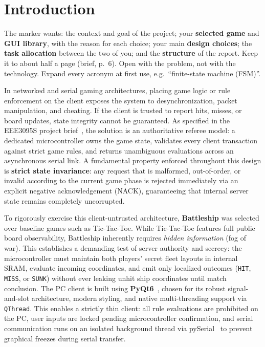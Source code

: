 \section{Introduction}
\label{sec:intro}

\begin{guidance}
The marker wants: the context and goal of the project; your \textbf{selected
game} and \textbf{GUI library}, with the reason for each choice; your main
\textbf{design choices}; the \textbf{task allocation} between the two of you; and
the \textbf{structure} of the report. Keep it to about half a page (brief,
p.~6). Open with the problem, not with the technology. Expand every acronym at
first use, e.g.\ ``finite-state machine (FSM)''.
\end{guidance}

In networked and serial gaming architectures, placing game logic or rule enforcement on the client exposes the system to desynchronization, packet manipulation, and cheating. If the client is trusted to report hits, misses, or board updates, state integrity cannot be guaranteed. As specified in the EEE3095S project brief~\cite{brief}, the solution is an authoritative referee model: a dedicated microcontroller owns the game state, validates every client transaction against strict game rules, and returns unambiguous evaluations across an asynchronous serial link. A fundamental property enforced throughout this design is \textbf{strict state invariance}: any request that is malformed, out-of-order, or invalid according to the current game phase is rejected immediately via an explicit negative acknowledgement (NACK), guaranteeing that internal server state remains completely uncorrupted.

To rigorously exercise this client-untrusted architecture, \textbf{Battleship} was selected over baseline games such as Tic-Tac-Toe. While Tic-Tac-Toe features full public board observability, Battleship inherently requires \textit{hidden information} (fog of war). This establishes a demanding test of server authority and secrecy: the microcontroller must maintain both players' secret fleet layouts in internal SRAM, evaluate incoming coordinates, and emit only localized outcomes (\texttt{HIT}, \texttt{MISS}, or \texttt{SUNK}) without ever leaking unhit ship coordinates until match conclusion. The PC client is built using \textbf{PyQt6}~\cite{guilib}, chosen for its robust signal-and-slot architecture, modern styling, and native multi-threading support via \texttt{QThread}. This enables a strictly thin client: all rule evaluations are prohibited on the PC, user inputs are locked pending microcontroller confirmation, and serial communication runs on an isolated background thread via pySerial~\cite{pyserial} to prevent graphical freezes during serial transfer.

